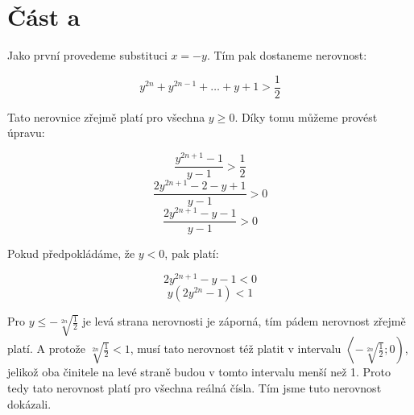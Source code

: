 \documentclass{fkssolpub}
\author{Ondřej Sedláček}
\begin{document}
\section{Část a}

Jako první provedeme substituci $x = -y$. Tím pak dostaneme nerovnost:

\[
	y^{2n} + y^{2n - 1} + \dots + y + 1 > \frac{1}{2}
\]

Tato nerovnice zřejmě platí pro všechna $y \geq 0$. Díky tomu můžeme provést
úpravu:

\[
	\frac{y^{2n + 1} - 1}{y - 1} > \frac{1}{2}
\]
\[
	\frac{2y^{2n + 1} - 2 - y + 1}{y - 1} > 0
\]
\[
	\frac{2y^{2n + 1} - y - 1}{y - 1} > 0
\]

Pokud předpokládáme, že $y < 0$, pak platí:

\[
	2y^{2n + 1} - y - 1 < 0
\]
\[
	y (2y^{2n} - 1) < 1
\]

Pro $y \leq - \sqrt[2n]{\frac{1}{2}}$ je levá strana nerovnosti je záporná, tím
pádem nerovnost zřejmě platí. A protože $\sqrt[2n]{\frac{1}{2}} < 1$, musí tato
nerovnost též platit v intervalu $\left\langle - \sqrt[2n]{\frac{1}{2}}; 0 \right)$,
jelikož oba činitele na levé straně budou v tomto intervalu menší než 1.
Proto tedy tato nerovnost platí pro všechna reálná čísla. Tím jsme tuto nerovnost
dokázali.
\end{document}

